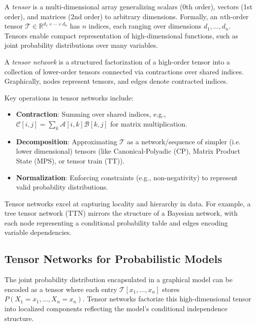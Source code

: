 \documentclass[encoding=utf8,british]{tumphthesis}
\begin{document}
            A \textit{tensor} is a multi-dimensional array generalizing scalars (0th order), vectors (1st order), and matrices 
            (2nd order) to arbitrary dimensions. Formally, an $n$th-order tensor $\mathcal{T} \in \mathbb{R}^{d_1 \times \cdots \times 
            d_n}$ has $n$ indices, each ranging over dimensions $d_1, \ldots, d_n$. Tensors enable compact representation of 
            high-dimensional functions, such as joint probability distributions over many variables.

            A \textit{tensor network} is a structured factorization of a high-order tensor into a collection of lower-order tensors 
            connected via contractions over shared indices. Graphically, nodes represent tensors, and edges denote contracted indices.

            Key operations in tensor networks include:
            \begin{itemize}
                \item \textbf{Contraction}: Summing over shared indices, e.g., $\mathcal{C}[i,j] = \sum_k \mathcal{A}[i,k] \mathcal{B}[k,j]$ for matrix multiplication.
                \item \textbf{Decomposition}: Approximating $\mathcal{T}$ as a network/sequence of simpler (i.e. lower dimensional) tensors  
                (like Canonical-Polyadic (CP), Matrix Product State (MPS), or tensor train (TT)).
                \item \textbf{Normalization}: Enforcing constraints (e.g., non-negativity) to represent valid probability distributions.
            \end{itemize}

            Tensor networks excel at capturing locality and hierarchy in data. For example, a tree tensor network (TTN) mirrors the 
            structure of a Bayesian network, with each node representing a conditional probability table and edges encoding variable 
            dependencies.

        \subsection{Tensor Networks for Probabilistic Models}
        \label{subsect:Foundations_TN_ProbNetw}

            The joint probability distribution encapsulated in a graphical model can be encoded as a tensor where each entry $\mathcal{T}[x_1, 
            \ldots, x_n]$ stores $P(X_1=x_1, \ldots, X_n=x_n)$. Tensor networks factorize this high-dimensional tensor into localized 
            components reflecting the model's conditional independence structure.
\end{document}
